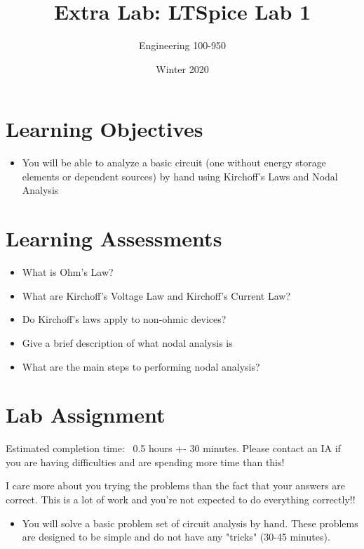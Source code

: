 \documentclass{article}
\title{Extra Lab: LTSpice Lab 1}
\date{Winter 2020}
\author{Engineering 100-950}
\begin{document}
\maketitle

\thispagestyle{fancy}

\section*{Learning Objectives}

\begin{itemize}
  \item You will be able to analyze a basic circuit (one without energy storage elements or dependent sources) by hand using Kirchoff's Laws and Nodal Analysis
\end{itemize}

\section*{Learning Assessments}

\begin{itemize}

  \item What is Ohm's Law?
  \item What are Kirchoff's Voltage Law and Kirchoff's Current Law?
  \item Do Kirchoff's laws apply to non-ohmic devices?
  \item Give a brief description of what nodal analysis is
  \item What are the main steps to performing nodal analysis?
\end{itemize}

\section*{Lab Assignment}

Estimated completion time: ~0.5 hours +- 30 minutes. Please contact an IA if you are having difficulties and are spending more time than this!

I care more about you trying the problems than the fact that your answers are correct. This is a lot of work and you're not expected to do everything correctly!!

\begin{itemize}
  \item You will solve a basic problem set of circuit analysis by hand. These problems are designed to be simple and do not have any "tricks" (30-45 minutes).
\end{itemize}
\end{document}
